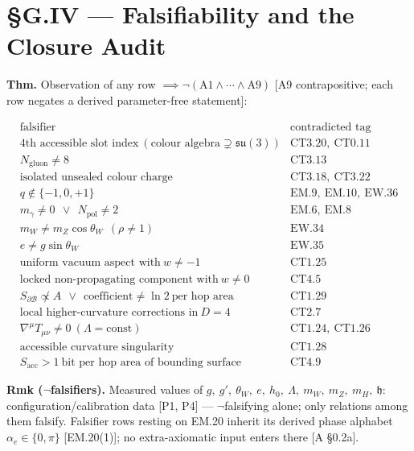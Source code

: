 \section[§G.IV — Falsifiability and the Closure Audit]{\texorpdfstring{§G.IV — Falsifiability and the Closure Audit}{SG.IV - Falsifiability and the Closure Audit}}

\begin{theorem}\label{tag:CT4-12}
\textbf{Thm.} Observation of any row $\implies\neg(\mathrm{A1}\wedge\cdots\wedge\mathrm{A9})$ [A9 contrapositive; each row negates a derived parameter-free statement]:

\[
\begin{array}{c|c}
\text{falsifier} & \text{contradicted tag}\\ \hline
\text{4th accessible slot index}\ (\text{colour algebra}\supsetneq\mathfrak{su}(3)) & \mathrm{CT3.20},\ \mathrm{CT0.11}\\
N_{\mathrm{gluon}}\ne8 & \mathrm{CT3.13}\\
\text{isolated unsealed colour charge} & \mathrm{CT3.18},\ \mathrm{CT3.22}\\
q\notin\{-1,0,+1\} & \mathrm{EM.9},\ \mathrm{EM.10},\ \mathrm{EW.36}\\
m_\gamma\ne0\ \ \vee\ \ N_{\mathrm{pol}}\ne2 & \mathrm{EM.6},\ \mathrm{EM.8}\\
m_W\ne m_Z\cos\theta_W\ \ (\rho\ne1) & \mathrm{EW.34}\\
e\ne g\sin\theta_W & \mathrm{EW.35}\\
\text{uniform vacuum aspect with}\ w\ne-1 & \mathrm{CT1.25}\\
\text{locked non-propagating component with}\ w\ne0 & \mathrm{CT4.5}\\
S_{\partial\mathcal B}\not\propto A\ \ \vee\ \ \text{coefficient}\ne\ln2\ \text{per hop area} & \mathrm{CT1.29}\\
\text{local higher-curvature corrections in}\ D=4 & \mathrm{CT2.7}\\
\nabla^\mu T_{\mu\nu}\ne0\ (\Lambda=\mathrm{const}) & \mathrm{CT1.24},\ \mathrm{CT1.26}\\
\text{accessible curvature singularity} & \mathrm{CT1.28}\\
S_{\mathrm{acc}}>1\ \text{bit per hop area of bounding surface} & \mathrm{CT4.9}
\end{array}
\]

\textbf{Rmk ($\neg$falsifiers).} Measured values of $g,\ g',\ \theta_W,\ e,\ h_0,\ \Lambda,\ m_W,\ m_Z,\ m_H,\ \mathfrak h$: configuration/calibration data [P1, P4] — $\neg$falsifying alone; only relations among them falsify. Falsifier rows resting on EM.20 inherit its derived phase alphabet $\alpha_e\in\{0,\pi\}$ [EM.20(1)]; no extra-axiomatic input enters there [A §0.2a].


\end{theorem}
